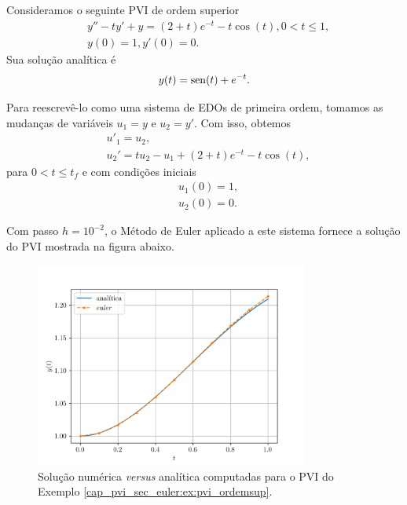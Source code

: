 \begin{ex}\label{cap_pvi_sec_euler:ex:pvi_ordemsup}
  Consideramos o seguinte PVI de ordem superior
  \begin{subequations}
    \begin{align}
      &y'' - ty' + y = (2 + t)e^{-t} - t\cos(t), 0 < t \leq 1,\\
      &y(0) = 1, y'(0) = 0.
    \end{align}
  \end{subequations}
  Sua solução analítica é
  \begin{equation}
    y(t) = \operatorname{sen}(t) + e^{-t}.
  \end{equation}

  Para reescrevê-lo como uma sistema de EDOs de primeira ordem, tomamos as mudanças de variáveis $u_1 = y$ e $u_2 = y'$. Com isso, obtemos
  \begin{subequations}
    \begin{align}
      &u'_1 = u_2,\\
      &u_2' = tu_2 - u_1 + (2+t)e^{-t} - t\cos(t),
    \end{align}
  \end{subequations}
  para $0 < t \leq t_f$ e com condições iniciais
  \begin{subequations}
    \begin{align}
      &u_1(0) = 1,\\
      &u_2(0) = 0.
    \end{align}
  \end{subequations}

  Com passo $h=10^{-2}$, o Método de Euler aplicado a este sistema fornece a solução do PVI mostrada na figura abaixo.

  \begin{figure}[H]
    \centering
    \includegraphics[width=0.8\textwidth]{./cap_pvi/dados/fig_euler_ordemsup/fig}
    \caption{Solução numérica \textit{versus} analítica computadas para o PVI do Exemplo \ref{cap_pvi_sec_euler:ex:pvi_ordemsup}.}
    \label{cap_pvi_sec_euler:fig:pvi_ordemsup}
  \end{figure}
\end{ex}

